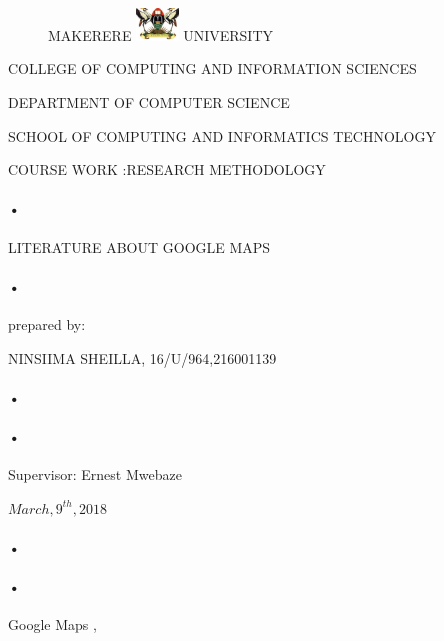 \documentclass[10pt,]{article}
\begin{document}
\begin{titlepage}
\begin{figure}[h]
  \centerline{\small MAKERERE 
    \includegraphics[width=0.1\textwidth]  {muk_log} UNIVERSITY}
\end{figure}
\centerline{COLLEGE OF COMPUTING AND INFORMATION SCIENCES\\}
\centerline{DEPARTMENT OF COMPUTER SCIENCE\\}
\centerline{SCHOOL OF COMPUTING AND INFORMATICS TECHNOLOGY\\}
\centerline{COURSE WORK :RESEARCH METHODOLOGY\\}
\paragraph*{•}
\centerline{LITERATURE ABOUT GOOGLE MAPS\\}
\paragraph*{•}
\centerline{prepared by:\\}
\centerline{NINSIIMA SHEILLA, 16/U/964,216001139\\}
\paragraph*{•}
\paragraph*{•}
\centerline{Supervisor: Ernest Mwebaze\\}
\centerline{ $March,9^{th},2018$\\}


\paragraph*{•}
\paragraph*{•}
  \begin{flushright}
 Google Maps ,\\
 
 \tableofcontents

  \end{flushright}
\date{\today}
\end{titlepage}
\end{document}

